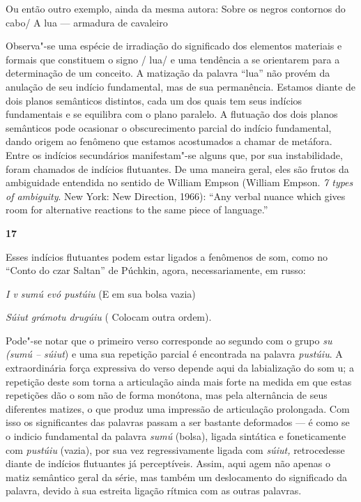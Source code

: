 Ou então outro exemplo, ainda da mesma autora: Sobre os negros contornos
do cabo/ A lua --- armadura de cavaleiro

Observa"-se uma espécie de irradiação do significado dos elementos
materiais e formais que constituem o signo / lua/ e uma tendência a se
orientarem para a determinação de um conceito. A matização da palavra
``lua'' não provém da anulação de seu indício fundamental, mas de sua
permanência. Estamos diante de dois planos semânticos distintos, cada um
dos quais tem seus indícios fundamentais e se equilibra com o plano
paralelo. A flutuação dos dois planos semânticos pode ocasionar o
obscurecimento parcial do indício fundamental, dando origem ao fenômeno
que estamos acostumados a chamar de metáfora. Entre os indícios
secundários manifestam"-se alguns que, por sua instabilidade, foram
chamados de indícios flutuantes. De uma maneira geral, eles são frutos
da ambiguidade entendida no sentido de William Empson (William Empson.
\emph{7 types of ambiguity}. New York: New Direction, 1966): ``Any
verbal nuance which gives room for alternative reactions to the same
piece of language.''

\textbf{17}

Esses indícios flutuantes podem estar ligados a fenômenos de som, como
no ``Conto do czar Saltan'' de Púchkin, agora, necessariamente, em
russo:

\emph{I v sumú evó pustúiu} (E em sua bolsa vazia)

\emph{Súiut grámotu drugúiu} ( Colocam outra ordem).

Pode"-se notar que o primeiro verso corresponde ao segundo com o grupo
\emph{su (sumú -- súiut}) e uma sua repetição parcial é encontrada na
palavra \emph{pustúiu}. A extraordinária força expressiva do verso
depende aqui da labialização do som {u}; a repetição deste som torna a
articulação ainda mais forte na medida em que estas repetições dão o som
não de forma monótona, mas pela alternância de seus diferentes matizes,
o que produz uma impressão de articulação prolongada. Com isso os
significantes das palavras passam a ser bastante deformados --- é como se
o indicio fundamental da palavra \emph{sumú} (bolsa), ligada sintática e
foneticamente com \emph{pustúiu} (vazia), por sua vez regressivamente
ligada com \emph{súiut,} retrocedesse diante de indícios flutuantes já
perceptíveis. Assim, aqui agem não apenas o matiz semântico geral da
série, mas também um deslocamento do significado da palavra, devido à
sua estreita ligação rítmica com as outras palavras.

